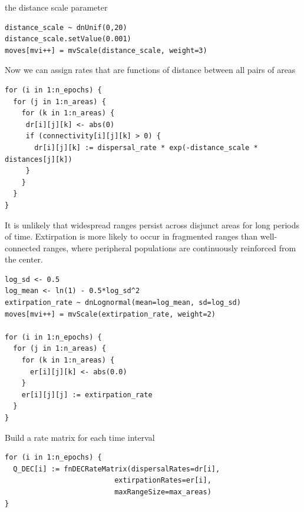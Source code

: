 the distance scale parameter

\begin{snugshade}
\begin{lstlisting}
distance_scale ~ dnUnif(0,20)
distance_scale.setValue(0.001)
moves[mvi++] = mvScale(distance_scale, weight=3)
\end{lstlisting}
\end{snugshade}


Now we can assign rates that are functions of distance between all pairs of areas

\begin{snugshade}
\begin{lstlisting}
for (i in 1:n_epochs) {
  for (j in 1:n_areas) {
    for (k in 1:n_areas) {
     dr[i][j][k] <- abs(0)
     if (connectivity[i][j][k] > 0) {
       dr[i][j][k] := dispersal_rate * exp(-distance_scale * distances[j][k])
     }
    }
  }
}
\end{lstlisting}
\end{snugshade}



It is unlikely that widespread ranges persist across disjunct areas for long periods of time.
Extirpation is more likely to occur in fragmented ranges than well-connected ranges, where peripheral populations are continuously reinforced from the center.

\begin{snugshade}
\begin{lstlisting}
log_sd <- 0.5
log_mean <- ln(1) - 0.5*log_sd^2
extirpation_rate ~ dnLognormal(mean=log_mean, sd=log_sd)
moves[mvi++] = mvScale(extirpation_rate, weight=2)

for (i in 1:n_epochs) {
  for (j in 1:n_areas) {
    for (k in 1:n_areas) {
      er[i][j][k] <- abs(0.0) 
    }
    er[i][j][j] := extirpation_rate
  }
}

\end{lstlisting}
\end{snugshade}


Build a rate matrix for each time interval
\begin{snugshade}
\begin{lstlisting}
for (i in 1:n_epochs) {
  Q_DEC[i] := fnDECRateMatrix(dispersalRates=dr[i],
                          extirpationRates=er[i],
                          maxRangeSize=max_areas)
}
\end{lstlisting}
\end{snugshade}



